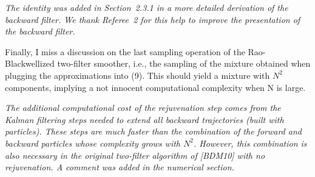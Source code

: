 \vspace{.2cm}
{\em
\noindent The identity was added in Section~2.3.1 in a more detailed derivation of the backward filter. We thank Referee~2 for this help to improve the presentation of the backward filter.
}

\vspace{.5cm}

\noindent Finally, I miss a discussion on the last sampling operation of the Rao-Blackwellized
two-filter smoother, i.e., the sampling of the mixture obtained when plugging the approximations into (9). This should yield a mixture with $N^2$ components, implying a not innocent computational complexity when N is large.

\vspace{.2cm}
{\em
\noindent The additional computational cost of the rejuvenation step comes from the Kalman filtering steps needed to extend all backward trajectories (built with particles). These steps are much faster than the combination of the forward and backward particles whose complexity grows with $N^2$. However, this combination is also necessary in the original two-filter algorithm of [BDM10] with no rejuvenation. A comment was added in the numerical section.
}

\vspace{.5cm}

